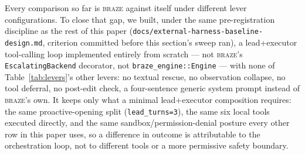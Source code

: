 \documentclass[smallcondensed,natbib]{svjour3}
\newcommand{\braze}{\textsc{braze}}
\begin{document}
Every comparison so far is \braze{} against itself under different lever
configurations. To close that gap, we built, under the same
pre-registration discipline as the rest of this paper
(\texttt{docs/external-harness-baseline-design.md}, criterion committed
before this section's sweep ran), a lead+executor tool-calling loop
implemented entirely from scratch --- not \braze{}'s
\texttt{EscalatingBackend} decorator, not \texttt{braze\_engine::Engine}
--- with none of Table~\ref{tab:levers}'s other levers: no textual
rescue, no observation collapse, no tool deferral, no post-edit check,
a four-sentence generic system prompt instead of \braze{}'s own. It
keeps only what a minimal lead+executor composition requires: the same
proactive-opening split (\texttt{lead\_turns=3}), the same six local
tools executed directly, and the same sandbox/permission-denial posture
every other row in this paper uses, so a difference in outcome is
attributable to the orchestration loop, not to different tools or a
more permissive safety boundary.
\end{document}
